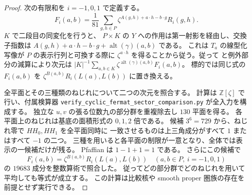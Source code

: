 \begin{proof}
次の有限和を $i=-1,0,1$ で定義する。
\[
 F_i(a,b)=\frac1{81}\sum_{g,h\in P}
 \zeta^{A(g,h)+a\cdot h-b\cdot g}R_i(g,h).
\]
$K$ で二段目の同変化を行うと、
$P\times K$ の $Y$ への作用は第一射影を経由し、交換子指数は
$A(g,h)+a\cdot h-b\cdot g+\operatorname{alt}(\gamma)(a,b)$ である。
これは $T_a$ の線型化写像が $P$ の表示行列と可換する際に
$\zeta^{a\cdot h}$ を得ることから従う。従って
\cite[Theorem~5]{QFOBaranovskyPetrov}と例外部分の減算により次元は
$|K|^{-1}\sum_{a,b\in K}\zeta^{\operatorname{alt}(\gamma)(a,b)} F_i(a,b)$。
標的では同じ式の $F_i(a,b)$ を
$\zeta^{B(a,b)}R_i(L(a),L(b))$ に置き換える。

全平面とその三種類のねじれについて二つの次元を照合する。
計算は $\mathbb Z[\zeta]$ で行い、付属検算器
\texttt{verify\_cyclic\_fermat\_sector\_comparison.py} が全入力を構成する。
独立な $u,v$ の張る位数九の部分群を重複除去し $130$ 平面を得る。
各平面上のねじれは基底の面積形式の $0,1,2$ 倍である。
候補 $3^6=729$ から、ねじれ零で $HH_0,HH_1$ を全平面同時に
一致させるものは上三角成分がすべて $1$ またはすべて $-1$ の二つ。
三種を用いると各平面の制限が一意となり、全体では表示の一候補だけが残る。
Pfaffian は $1-1+1=1$ である。
さらにこの候補で
\[
 F_i(a,b)=\zeta^{B(a,b)}R_i(L(a),L(b))
 \quad (a,b\in P,\ i=-1,0,1)
\]
の $19683$ 成分を整数算術で照合した。
従ってどの部分群でどのねじれを用いて平均しても等式が成立する。
この計算は比較核や smooth proper 圏族の存在を前提とせず実行できる。
\end{proof}
